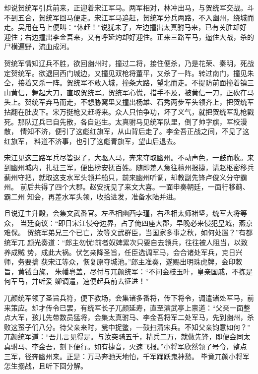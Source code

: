 却说贺统军引兵前来，正迎着宋江军马。两军相对，林冲出马，与贺统军交战。斗
不到五合，贺统军回马便走。宋江军马追赶，贺统军分兵两路，不入幽州，绕城而
走。吴用在马上便叫：“休赶！”说犹未了，左边撞出太真驸马来，已有关胜却好
迎住；右边撞出李金吾来，又有呼延灼却好迎住。正来三路军马，逼住大战，杀的
尸横遍野，流血成河。

贺统军情知辽兵不胜，欲回幽州时，撞过二将，接住便杀，乃是花荣、秦明，死战
定贺统军。欲退回西门城边，又撞见双枪将董平，又杀了一阵。转过南门，撞见朱
仝，接着又杀一阵。贺统军不敢入城，撞条大路，望北而走。不提防前面撞着镇三
山黄信，舞起大刀，直取贺统军。贺统军心慌，措手不及，被黄信一刀，正砍在马
头上。贺统军弃马而走，不想胁窝里又撞出杨雄、石秀两步军头领齐上，把贺统军
拈翻在肚皮下。宋万挺枪又赶将来。众人只怕争功，坏了义气，就把贺统军乱枪戳
死。那队辽兵已自先散，各自逃生。太真驸马见统军队里，倒了帅字旗，军校漫散，
情知不济，便引了这彪红旗军，从山背后走了。李金吾正战之间，不见了这红旗军，
料道不济事，也引了这彪青旗军，望山后退去。

宋江见这三路军兵尽皆退了，大驱人马，奔来夺取幽州。不动声色，一鼓而收。来
到幽州城内，扎驻三军，便出榜安抚百姓。随即差人急往檀州报捷，请赵枢密移兵
蓟州守把，就取这支水军头领并船只，前来幽州听调，却教副先锋卢俊义分守霸州。
前后共得了四个大郡。赵安抚见了来文大喜。一面申奏朝廷，一面行移蓟、霸二州
知会，再差水军头领，收拾进发，准备水陆并进。

且说辽主升殿，会集文武番官。左丞相幽西孛瑾，右丞相太师褚坚，统军大将等众，
当廷商议：“即日宋江侵夺边界，占了俺四座大郡，早晚必来侵犯皇城，燕京难保。
贺统军弟兄三个已亡，汝等文武群臣，当国家多事之秋，如何处置？”有都统军兀
颜光奏道：“郎主勿忧!前者奴婢累次只要自去领兵，往往被人阻当，以致养成贼
势，成此大祸。伏乞亲降圣旨，任臣选调军马，会合诸处军兵，克日兴师，务要擒
获宋江等众，恢复原夺城池。”郎主准奏，遂赐出明珠虎牌，金印敕旨，黄钺白旄，
朱幡皂盖，尽付与兀颜统军：“不问金枝玉叶，皇亲国戚，不拣是何军马，并听爱
卿调遣，速便起兵前去征进！”

兀颜统军领了圣旨兵符，便下教场，会集诸多番将，传下将令，调遣诸处军马，前
来策应。却才传令已罢，有统军长子兀颜延寿，直至演武亭上禀道：“父亲一面整
点大军，孩儿先带数员猛将，会集太真驸马、李金吾将军二处军马，先到幽州，杀
败这蛮子们八分。待父亲来时，瓮中捉鳖，一鼓扫清宋兵。不知父亲钧意如何？”
兀颜统军道：“吾儿言见得是。与汝突骑五千，精兵二万，就做先锋，即便会同太
真驸马、李金吾，刻下便行。如有捷音，火速飞报。”小将军欣然领了号令，整点
三军，径奔幽州来。正是：万马奔驰天地怕，千军踊跃鬼神愁。
毕竟兀颜小将军怎生搦战，且听下回分解。
